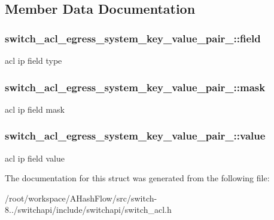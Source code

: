 \subsection{Member Data Documentation}
\hypertarget{structswitch__acl__egress__system__key__value__pair___a534fb49cae3ab1d32956795cc256fa4f}{
\subsubsection[{field}]{ switch\+\_\+acl\+\_\+egress\+\_\+system\+\_\+key\+\_\+value\+\_\+pair\+\_\+\+::field}}\label{structswitch__acl__egress__system__key__value__pair___a534fb49cae3ab1d32956795cc256fa4f}
acl ip field type \hypertarget{structswitch__acl__egress__system__key__value__pair___aef7495ee70d9c3ed29839f4ae5bc1654}{
\subsubsection[{mask}]{ switch\+\_\+acl\+\_\+egress\+\_\+system\+\_\+key\+\_\+value\+\_\+pair\+\_\+\+::mask}}\label{structswitch__acl__egress__system__key__value__pair___aef7495ee70d9c3ed29839f4ae5bc1654}
acl ip field mask \hypertarget{structswitch__acl__egress__system__key__value__pair___a07d0b9279e874685a96c950f7e65879f}{
\subsubsection[{value}]{ switch\+\_\+acl\+\_\+egress\+\_\+system\+\_\+key\+\_\+value\+\_\+pair\+\_\+\+::value}}\label{structswitch__acl__egress__system__key__value__pair___a07d0b9279e874685a96c950f7e65879f}
acl ip field value 

The documentation for this struct was generated from the following file\+:\begin{DoxyCompactItemize}
\item 
/root/workspace/\+A\+Hash\+Flow/src/switch-\/8../switchapi/include/switchapi/switch\+\_\+acl.\+h\end{DoxyCompactItemize}
